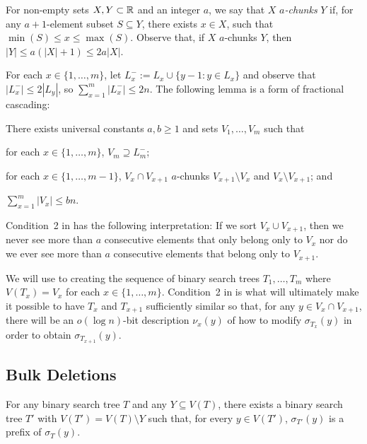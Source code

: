\documentclass[kpfonts]{patmorin}
\begin{document}
For non-empty sets $X,Y\subset \mathbb{R}$ and an integer $a$, we say that $X$ \emph{$a$-chunks} $Y$ if, for any $a+1$-element subset $S\subseteq Y$, there exists $x\in X$, such that $\min(S)\le x\le \max(S)$. Observe that, if $X$ $a$-chunks $Y$, then $|Y|\le a(|X|+1)\le 2a|X|$.

For each $x\in\{1,\ldots,m\}$, let $L^-_x:=L_x\cup \{y-1:y\in L_x\}$ and observe that $|L^-_x|\le 2|L_y|$, so $\sum_{x=1}^m|L^-_x| \le 2n$.  The following lemma is a form of fractional cascading:

\begin{lem}
  There exists universal constants $a,b\ge 1$ and sets $V_1,\ldots,V_m$ such that
  \begin{compactenum}
    \item for each $x\in\{1,\ldots,m\}$, $V_m\supseteq L^-_m$;
    \item for each $x\in\{1,\ldots,m-1\}$, $V_x\cap V_{x+1}$ $a$-chunks $V_{x+1}\setminus V_x$ and $V_x\setminus V_{x+1}$; and
    \item $\sum_{x=1}^m |V_x|\le bn$.
  \end{compactenum}
\end{lem}

Condition~2 in  has the following interpretation:  If we sort $V_x\cup V_{x+1}$, then we never see more than $a$ consecutive elements that only belong only to $V_x$ nor do we ever see more than $a$ consecutive elements that belong only to $V_{x+1}$.

We will use  to creating the sequence of binary search trees $T_1,\ldots,T_m$ where $V(T_x)=V_x$ for each $x\in\{1,\ldots,m\}$.  Condition~2 in  is what will ultimately make it possible to have $T_x$ and $T_{x+1}$ sufficiently similar so that, for any $y\in V_x\cap V_{x+1}$, there will be an $o(\log n)$-bit description $\nu_x(y)$ of how to modify $\sigma_{T_x}(y)$ in order to obtain $\sigma_{T_{x+1}}(y)$.

\subsection{Bulk Deletions}

\begin{lem}
  For any binary search tree $T$ and any $Y\subseteq V(T)$, there exists a binary search tree $T'$ with $V(T')=V(T)\setminus Y$ such that, for every $y\in V(T')$, $\sigma_{T'}(y)$ is a prefix of $\sigma_{T}(y)$.
\end{lem}
\end{document}
